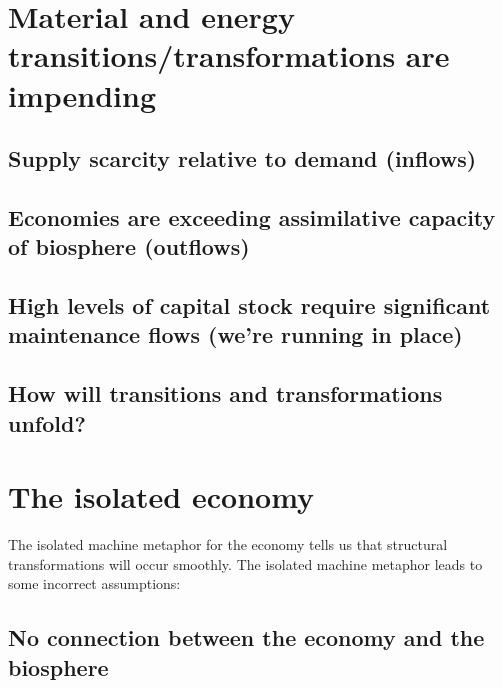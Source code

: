 \section{Material and energy transitions/transformations are impending}
\label{sec:transition}

\subsection{Supply scarcity relative to demand (inflows)}
\label{sec:scarcity}

\subsection{Economies are exceeding assimilative capacity of biosphere (outflows)}
\label{sec:exceed}

\subsection{High levels of capital stock require significant maintenance flows (we're running in place)}
\label{sec:running_in_place}

\subsection{How will transitions and transformations unfold?}
\label{sec:unfold}

\section{The isolated economy}
\label{sec:isolated_economy}

The isolated machine metaphor for the economy tells us that structural transformations will occur smoothly. 
     The isolated machine metaphor leads to some incorrect assumptions:

\subsection{No connection between the economy and the biosphere}
\label{sec:no_connection}

